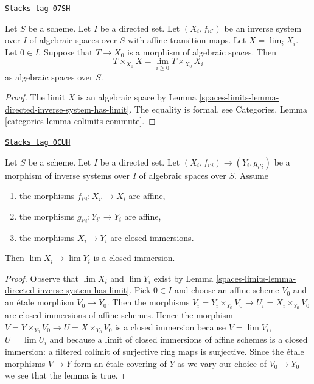 \begin{lemma}
\label{spaces-limits-lemma-space-over-limit}
\href{https://stacks.math.columbia.edu/tag/07SH}{\texttt{Stacks tag 07SH}}

Let $S$ be a scheme. Let $I$ be a directed set.
Let $(X_i, f_{ii'})$ be an inverse system over $I$ of algebraic spaces
over $S$ with affine transition maps.
Let $X = \lim_i X_i$. Let $0 \in I$. Suppose that $T \to X_0$ is a
morphism of algebraic spaces. Then
$$
T \times_{X_0} X = \lim_{i \geq 0} T \times_{X_0} X_i
$$
as algebraic spaces over $S$.
\end{lemma}

\begin{proof}
The limit $X$ is an algebraic space by
Lemma \ref{spaces-limits-lemma-directed-inverse-system-has-limit}.
The equality is formal, see
Categories, Lemma \ref{categories-lemma-colimits-commute}.
\end{proof}

\begin{lemma}
\label{spaces-limits-lemma-directed-inverse-system-closed-immersions}
\href{https://stacks.math.columbia.edu/tag/0CUH}{\texttt{Stacks tag 0CUH}}

Let $S$ be a scheme. Let $I$ be a directed set.
Let $(X_i, f_{i'i}) \to (Y_i, g_{i'i})$ be a morphism
of inverse systems over $I$ of algebraic spaces over $S$.
Assume
\begin{enumerate}
\item the morphisms $f_{i'i} : X_{i'} \to X_i$ are affine,
\item the morphisms $g_{i'i} : Y_{i'} \to Y_i$ are affine,
\item the morphisms $X_i \to Y_i$ are closed immersions.
\end{enumerate}
Then $\lim X_i \to \lim Y_i$ is a closed immersion.
\end{lemma}

\begin{proof}
Observe that $\lim X_i$ and $\lim Y_i$ exist by
Lemma \ref{spaces-limits-lemma-directed-inverse-system-has-limit}.
Pick $0 \in I$ and choose an affine scheme $V_0$ and an \'etale morphism
$V_0 \to Y_0$. Then the morphisms
$V_i = Y_i \times_{Y_0} V_0 \to U_i = X_i \times_{Y_0} V_0$
are closed immersions of affine schemes.
Hence the morphism $V = Y \times_{Y_0} V_0 \to U = X \times_{Y_0} V_0$
is a closed immersion because $V = \lim V_i$, $U = \lim U_i$
and because a limit of closed immersions of affine schemes is a
closed immersion: a filtered colimit of surjective ring maps
is surjective. Since the \'etale morphisms $V \to Y$ form an
\'etale covering of $Y$ as we vary our choice of $V_0 \to Y_0$
we see that the lemma is true.
\end{proof}

